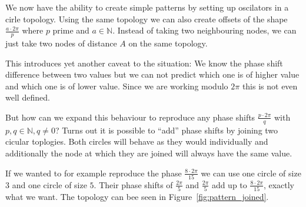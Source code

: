 We now have the ability to create simple patterns by setting up oscilators in a cirle topology. Using the same topology we can also create offsets of the shape $\frac{a {\cdot} 2 \pi}{p}$ where $p$ prime and $a \in \mathbb{N}$. Instead of taking two neighbouring nodes, we can just take two nodes of distance $A$ on the same topology. 

This introduces yet another caveat to the situation: We know the phase shift difference between two values but we can not predict which one is of higher value and which one is of lower value. Since we are working modulo $2 \pi$ this is not even well defined. 

But how can we expand this behaviour to reproduce any phase shifts $\frac{p {\cdot} 2 \pi}{q}$ with $p, q \in \mathbb{N}, q \neq 0$? Turns out it is possible to ``add'' phase shifts by joining two cicular toplogies. Both circles will behave as they would individually and additionally the node at which they are joined will always have the same value. 

If we wanted to for example reproduce the phase $\frac{8 {\cdot} 2 \pi}{15}$ we can use one circle of size $3$ and one circle of size $5$. Their phase shifts of $\frac{2\pi}{5}$ and $\frac{2\pi}{5}$ add up to $\frac{8 {\cdot} 2 \pi}{15}$, exactly what we want. The topology can bee seen in Figure~\ref{fig:pattern_joined}. 

